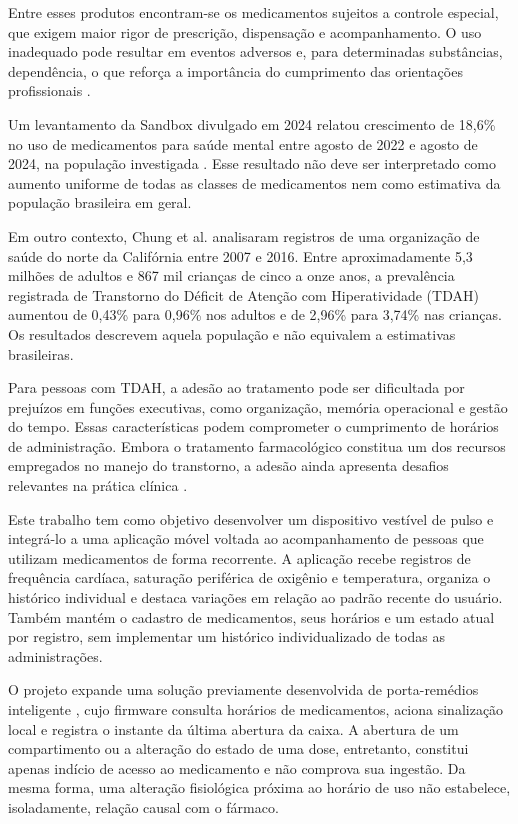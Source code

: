 \documentclass[12pt]{article}
\begin{document}
Entre esses produtos encontram-se os medicamentos sujeitos a controle especial, que exigem maior rigor de prescrição, dispensação e acompanhamento. O uso inadequado pode resultar em eventos adversos e, para determinadas substâncias, dependência, o que reforça a importância do cumprimento das orientações profissionais \cite{anvisa3441998}.

Um levantamento da Sandbox divulgado em 2024 relatou crescimento de 18,6\% no uso de medicamentos para saúde mental entre agosto de 2022 e agosto de 2024, na população investigada \cite{sandbox:2024}. Esse resultado não deve ser interpretado como aumento uniforme de todas as classes de medicamentos nem como estimativa da população brasileira em geral.

Em outro contexto, Chung et al. \cite{chung2019trends} analisaram registros de uma organização de saúde do norte da Califórnia entre 2007 e 2016. Entre aproximadamente 5,3 milhões de adultos e 867 mil crianças de cinco a onze anos, a prevalência registrada de Transtorno do Déficit de Atenção com Hiperatividade (TDAH) aumentou de 0,43\% para 0,96\% nos adultos e de 2,96\% para 3,74\% nas crianças. Os resultados descrevem aquela população e não equivalem a estimativas brasileiras.

Para pessoas com TDAH, a adesão ao tratamento pode ser dificultada por prejuízos em funções executivas, como organização, memória operacional e gestão do tempo. Essas características podem comprometer o cumprimento de horários de administração. Embora o tratamento farmacológico constitua um dos recursos empregados no manejo do transtorno, a adesão ainda apresenta desafios relevantes na prática clínica \cite{nguyen2025factors}.

Este trabalho tem como objetivo desenvolver um dispositivo vestível de pulso e integrá-lo a uma aplicação móvel voltada ao acompanhamento de pessoas que utilizam medicamentos de forma recorrente. A aplicação recebe registros de frequência cardíaca, saturação periférica de oxigênio e temperatura, organiza o histórico individual e destaca variações em relação ao padrão recente do usuário. Também mantém o cadastro de medicamentos, seus horários e um estado atual por registro, sem implementar um histórico individualizado de todas as administrações.

O projeto expande uma solução previamente desenvolvida de porta-remédios inteligente \cite{timecare_github}, cujo firmware consulta horários de medicamentos, aciona sinalização local e registra o instante da última abertura da caixa. A abertura de um compartimento ou a alteração do estado de uma dose, entretanto, constitui apenas indício de acesso ao medicamento e não comprova sua ingestão. Da mesma forma, uma alteração fisiológica próxima ao horário de uso não estabelece, isoladamente, relação causal com o fármaco.
\end{document}
